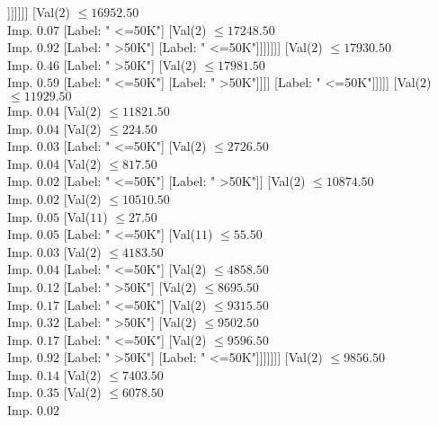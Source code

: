 \documentclass[margin=10pt]{standalone}
\begin{document}
\begin{forest}
																			[Label: " <=50K"]]]]]]]
													[Val($2$) $ \leq 16952.50$ \\ Imp. $0.07$
														[Label: " <=50K"]
														[Val($2$) $ \leq 17248.50$ \\ Imp. $0.92$
															[Label: " >50K"]
															[Label: " <=50K"]]]]]]]
									[Val($2$) $ \leq 17930.50$ \\ Imp. $0.46$
										[Label: " >50K"]
										[Val($2$) $ \leq 17981.50$ \\ Imp. $0.59$
											[Label: " <=50K"]
											[Label: " >50K"]]]]
								[Label: " <=50K"]]]]]
				[Val($2$) $ \leq 11929.50$ \\ Imp. $0.04$
					[Val($2$) $ \leq 11821.50$ \\ Imp. $0.04$
						[Val($2$) $ \leq 224.50$ \\ Imp. $0.03$
							[Label: " <=50K"]
							[Val($2$) $ \leq 2726.50$ \\ Imp. $0.04$
								[Val($2$) $ \leq 817.50$ \\ Imp. $0.02$
									[Label: " <=50K"]
									[Label: " >50K"]]
								[Val($2$) $ \leq 10874.50$ \\ Imp. $0.02$
									[Val($2$) $ \leq 10510.50$ \\ Imp. $0.05$
										[Val($11$) $ \leq 27.50$ \\ Imp. $0.05$
											[Label: " <=50K"]
											[Val($11$) $ \leq 55.50$ \\ Imp. $0.03$
												[Val($2$) $ \leq 4183.50$ \\ Imp. $0.04$
													[Label: " <=50K"]
													[Val($2$) $ \leq 4858.50$ \\ Imp. $0.12$
														[Label: " >50K"]
														[Val($2$) $ \leq 8695.50$ \\ Imp. $0.17$
															[Label: " <=50K"]
															[Val($2$) $ \leq 9315.50$ \\ Imp. $0.32$
																[Label: " >50K"]
																[Val($2$) $ \leq 9502.50$ \\ Imp. $0.17$
																	[Label: " <=50K"]
																	[Val($2$) $ \leq 9596.50$ \\ Imp. $0.92$
																		[Label: " >50K"]
																		[Label: " <=50K"]]]]]]]
												[Val($2$) $ \leq 9856.50$ \\ Imp. $0.14$
													[Val($2$) $ \leq 7403.50$ \\ Imp. $0.35$
														[Val($2$) $ \leq 6078.50$ \\ Imp. $0.02$

\end{forest}
\end{document}
